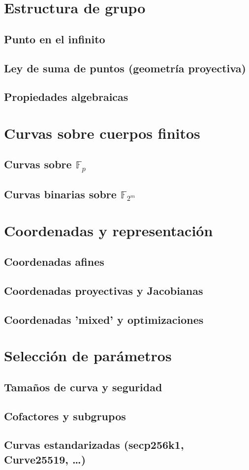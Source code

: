 \section{Estructura de grupo}
\subsection{Punto en el infinito}
\subsection{Ley de suma de puntos (geometría proyectiva)}
\subsection{Propiedades algebraicas}

\section{Curvas sobre cuerpos finitos}\label{sec:curvas_sobre_cuerpos_finitos}
\subsection{Curvas sobre \texorpdfstring{$\mathbb{F}_p$}{Fp}}\label{sec:curvas_sobre_cuerpos_finitos_primos}
\subsection{Curvas binarias sobre \texorpdfstring{$\mathbb{F}_{2^m}$}{F2m}}\label{sec:curvas_sobre_cuerpos_finitos_binarios}

\section{Coordenadas y representación}\label{sec:coordenadas_curvas_elipticas}
\subsection{Coordenadas afines}
\subsection{Coordenadas proyectivas y Jacobianas}
\subsection{Coordenadas 'mixed' y optimizaciones}

\section{Selección de parámetros}
\subsection{Tamaños de curva y seguridad}
\subsection{Cofactores y subgrupos}
\subsection{Curvas estandarizadas (secp256k1, Curve25519, …)}